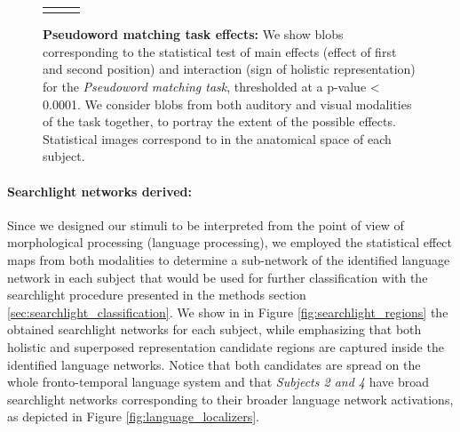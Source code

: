 \begin{figure}[ht]
\begin{tabular}{ccc}
\hspace{-1ex} \\
\end{tabular}
\vspace{3ex}
\caption{\textbf{Pseudoword matching task effects:} We show blobs corresponding to the statistical test of main effects (effect of first and second position) and interaction (sign of holistic representation) for the \emph{Pseudoword matching task}, thresholded at a p-value < 0.0001.
We consider blobs from both auditory and visual modalities of the task together, to portray the extent of the possible effects. Statistical images correspond to in the anatomical space of each subject.}
\label{fig:syllable_effects}
\end{figure}


\paragraph{Searchlight networks derived:}
Since we designed our stimuli to be interpreted from the point of view of morphological processing (language processing), we employed the statistical effect maps from both modalities to determine a sub-network of the identified language network in each subject that would be used for further classification with the searchlight procedure presented in the methods section \ref{sec:searchlight_classification}.
We show in in Figure \ref{fig:searchlight_regions} the obtained searchlight networks for each subject, while emphasizing that both holistic and superposed representation candidate regions are captured inside the identified language networks.
Notice that both candidates are spread on the whole fronto-temporal language system and that \emph{Subjects 2 and 4} have broad searchlight networks corresponding to their broader language network activations, as depicted in Figure \ref{fig:language_localizers}.


